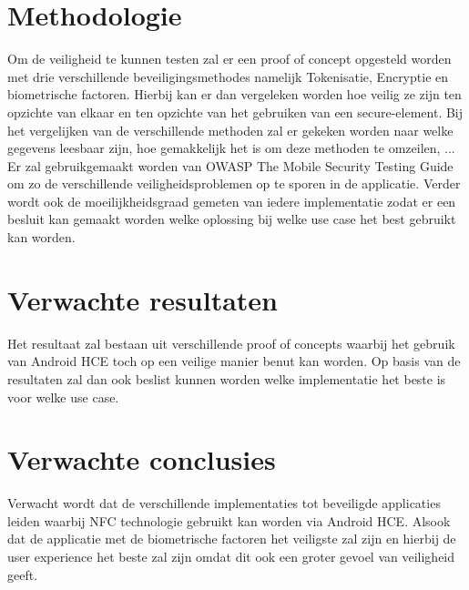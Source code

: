 

\section{Methodologie}
\label{sec:methodologie}

Om de veiligheid te kunnen testen zal er een proof of concept opgesteld worden met drie verschillende beveiligingsmethodes namelijk Tokenisatie, Encryptie en biometrische factoren. Hierbij kan er dan vergeleken worden hoe veilig ze zijn ten opzichte van elkaar en ten opzichte van het gebruiken van een secure-element. Bij het vergelijken van de verschillende methoden zal er gekeken worden naar welke gegevens leesbaar zijn, hoe gemakkelijk het is om deze methoden te omzeilen, ... Er zal gebruikgemaakt worden van OWASP The Mobile Security Testing Guide om zo de verschillende veiligheidsproblemen op te sporen in de applicatie. Verder wordt ook de moeilijkheidsgraad gemeten van iedere implementatie zodat er een besluit kan gemaakt worden welke oplossing bij welke use case het best gebruikt kan worden.

\section{Verwachte resultaten}
\label{sec:verwachte_resultaten}

Het resultaat zal bestaan uit verschillende proof of concepts waarbij het gebruik van Android HCE toch op een veilige manier benut kan worden. Op basis van de resultaten zal dan ook beslist kunnen worden welke implementatie het beste is voor welke use case.

\section{Verwachte conclusies}
\label{sec:verwachte_conclusies}

Verwacht wordt dat de verschillende implementaties tot beveiligde applicaties leiden waarbij NFC technologie gebruikt kan worden via Android HCE. Alsook dat de applicatie met de biometrische factoren het veiligste zal zijn en hierbij de user experience het beste zal zijn omdat dit ook een groter gevoel van veiligheid geeft.


